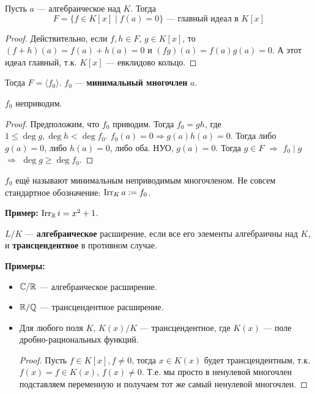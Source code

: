 \begin{theorem}
    Пусть $a$ --- алгебраическое над $K$. Тогда
    $$ F = \{ f \in K[x] \mid f(a) = 0 \} \text{ --- главный идеал в $K[x]$} $$
\end{theorem}
\begin{proof}
    Действительно, если $f, h \in F$, $g \in K[x]$, то
    $(f + h)(a) = f(a) + h(a) = 0$ и $(fg)(a) = f(a) g(a) = 0$. А этот идеал главный, т.к. $K[x]$ --- евклидово кольцо.
\end{proof}
\begin{conj}
    Тогда $F = \langle f_0 \rangle$. $f_0$ --- \textbf{минимальный многочлен} 
    $a$.
\end{conj}

\begin{lemma}
    $f_0$ неприводим.
\end{lemma}
\begin{proof}
    Предположим, что $f_0$ приводим. Тогда $f_0 = gh$, где $1 \leqslant \deg g, \deg h < \deg f_0$. $f_0(a) = 0 \Rightarrow g(a) h(a) = 0$. Тогда либо $g(a) = 0$, либо $h(a) = 0$, либо оба. НУО, $g(a) = 0$. Тогда $g \in F$ $\Rightarrow$ $f_0 \mid g$ $\Rightarrow$ $\deg g \geqslant \deg f_0$.
\end{proof}

\notice $f_0$ ещё называют минимальным неприводимым многочленом. 
Не совсем стандартное обозначение: $\operatorname{Irr}_K a := f_0$. 

\textbf{Пример:} $\operatorname{Irr}_{\mathbb{R}} i = x^2 + 1$.

\begin{conj}
    $L / K$ --- \textbf{алгебраическое} расширение, если все его элементы алгебраичны над $K$, и \textbf{трансцендентное} в противном случае.
\end{conj}
\textbf{Примеры:}
\begin{itemize}
    \item $\mathbb{C} / \mathbb{R}$ --- алгебраическое расширение.
    \item $\mathbb{R} / \mathbb{Q}$ --- трансцендентное расширение.
    \item Для любого поля $K$, $K(x) / K$ --- трансцендентное, где $K(x)$ --- поле дробно-рациональных функций. 
    
    \begin{proof}
        Пусть $f \in K[x], f \neq 0$, тогда $x \in K(x)$ будет трансцендентным, т.к. $f(x) = f \in K(x)$, $f(x) \neq 0$. Т.е. мы просто в ненулевой многочлен подставляем переменную и получаем тот же самый ненулевой многочлен.
    \end{proof}
\end{itemize}

